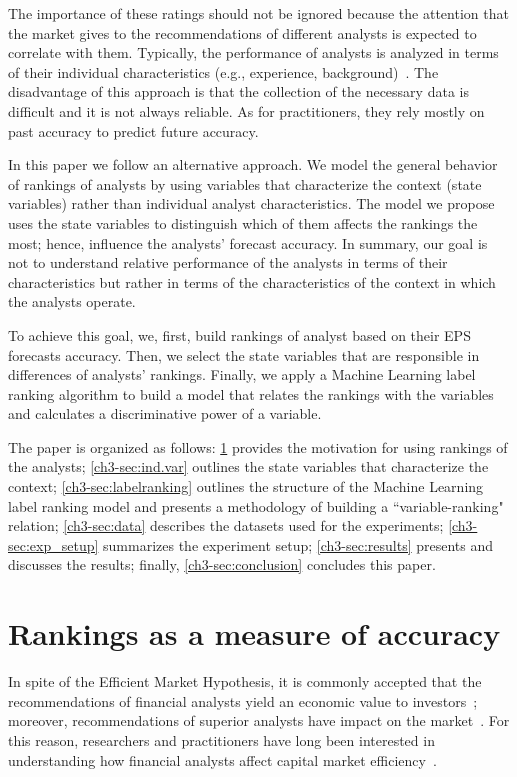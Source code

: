 \documentclass[12pt,a4paper]{article}\usepackage[]{graphicx}\usepackage[]{color}
\begin{document}
The importance of these ratings should not be ignored because the attention that the market gives to the recommendations of different analysts is expected to correlate with them. Typically, the performance of analysts is analyzed in terms of their individual characteristics (e.g., experience, background)~\citep{clement1999}. The disadvantage of this approach is that the collection of the necessary data is difficult and it is not always reliable. As for practitioners, they rely mostly on past accuracy to predict future accuracy.

In this paper we follow an alternative approach.  We model the general behavior of rankings of analysts by using variables that characterize the context (state variables) rather than individual analyst characteristics. The model we propose uses the state variables to distinguish which of them  affects the rankings the most; hence, influence the analysts' forecast accuracy. In summary, our goal is not to understand  relative performance of the analysts  in terms of their characteristics but rather in terms of the characteristics of the context in which the analysts operate.


To achieve this goal, we, first, build rankings of analyst based on their EPS forecasts accuracy. Then, we select the state variables that  are responsible in differences of analysts' rankings. Finally, we apply a Machine Learning label ranking algorithm to build a model that relates the rankings with the variables and calculates  a discriminative power of a variable.

The paper is organized as follows: \ref{ch3-sec:ranking} provides the motivation for using rankings of the analysts; \ref{ch3-sec:ind.var} outlines the state variables that characterize the context; \ref{ch3-sec:labelranking} outlines the structure of the Machine Learning label ranking model and presents a methodology of building a ``variable-ranking" relation; \ref{ch3-sec:data} describes the datasets used for the experiments; \ref{ch3-sec:exp_setup} summarizes the experiment setup;  \ref{ch3-sec:results} presents and discusses the results; finally, \ref{ch3-sec:conclusion} concludes this paper.


\section{Rankings as a measure of accuracy}
\label{ch3-sec:ranking}
In spite of the Efficient Market Hypothesis, it is commonly accepted that the recommendations of financial analysts yield an economic value to investors~\citep{womack1996}; moreover, recommendations of superior analysts have impact on the market~\citep{loh2011}. For this reason, researchers and practitioners have long been interested in understanding how financial analysts affect capital market efficiency~\citep{ramnath2008faf}.
\end{document}
